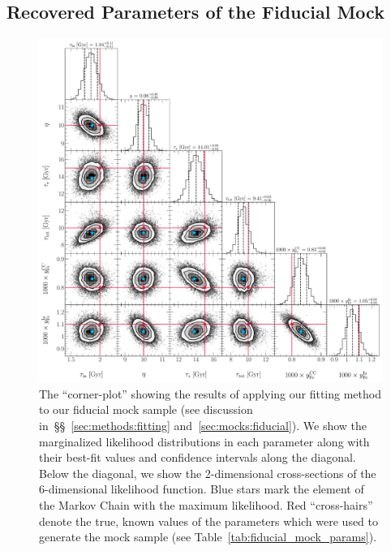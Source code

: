 \documentclass[ms.tex]{subfiles}
\begin{document}
\subsection{Recovered Parameters of the Fiducial Mock}
\label{sec:mocks:fiducial_fit}

\begin{figure}
\centering
\includegraphics[scale = 0.45]{fiducial_76k8.pdf}
\caption{
The ``corner-plot'' showing the results of applying our fitting method to our
fiducial mock sample (see discussion in~\S\S~\ref{sec:methods:fitting}
and~\ref{sec:mocks:fiducial}).
We show the marginalized likelihood distributions in each parameter along with
their best-fit values and confidence intervals along the diagonal.
Below the diagonal, we show the 2-dimensional cross-sections of the
6-dimensional likelihood function.
Blue stars mark the element of the Markov Chain with the maximum likelihood.
Red ``cross-hairs'' denote the true, known values of the parameters which were
used to generate the mock sample (see Table~\ref{tab:fiducial_mock_params}).
}
\label{fig:corner_fiducial}
\end{figure}
\end{document}
